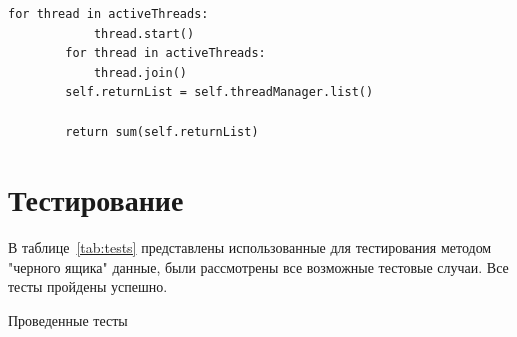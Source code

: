 \documentclass[12pt]{report}
\begin{document}
\begin{lstlisting}[caption=Параллельный алгоритм с делением на потоки\, класс Solver и функция calculateSumThreading,
        label={code:parallel}]
        for thread in activeThreads:
            thread.start()
        for thread in activeThreads:
            thread.join()
        self.returnList = self.threadManager.list()

        return sum(self.returnList)
    \end{lstlisting}


    \section{Тестирование}
    В таблице~\ref{tab:tests} представлены использованные для тестирования методом "черного ящика" данные,
    были рассмотрены все возможные тестовые случаи.
    Все тесты пройдены успешно.

    \begin{table}[H]
        \begin{center}
            \captionsetup{justification=raggedright, singlelinecheck=false}
            \caption[]{\label{tab:tests} Проведенные тесты}


\end{center}
\end{table}
\end{document}
